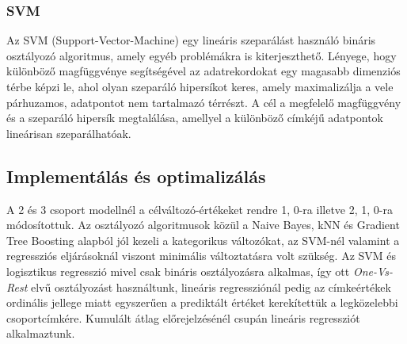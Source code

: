 \documentclass[12pt]{article}
\begin{document}
\subsubsection{SVM}

Az SVM (Support-Vector-Machine) egy lineáris szeparálást használó bináris osztályozó algoritmus, amely egyéb problémákra is kiterjeszthető. Lényege, hogy különböző magfüggvénye segítségével az adatrekordokat egy magasabb dimenziós térbe képzi le, ahol olyan szeparáló hipersíkot keres, amely maximalizálja a vele párhuzamos, adatpontot nem tartalmazó térrészt. A cél a megfelelő magfüggvény és a szeparáló hipersík megtalálása, amellyel a különböző címkéjű adatpontok lineárisan szeparálhatóak.




\subsection{Implementálás és optimalizálás}

A 2 és 3 csoport modellnél a célváltozó-értékeket rendre 1, 0-ra illetve 2, 1, 0-ra módosítottuk. Az osztályozó algoritmusok közül a Naive Bayes, kNN és Gradient Tree Boosting alapból jól kezeli a kategorikus változókat, az SVM-nél valamint a regressziós eljárásoknál viszont minimális változtatásra volt szükség. Az SVM és logisztikus regresszió mivel csak bináris osztályozásra alkalmas, így ott \textit{One-Vs-Rest} elvű osztályozást használtunk, lineáris regressziónál pedig az címkeértékek ordinális jellege miatt egyszerűen a prediktált értéket kerekítettük a legközelebbi csoportcímkére. Kumulált átlag előrejelzésénél csupán lineáris regressziót alkalmaztunk.
\end{document}

